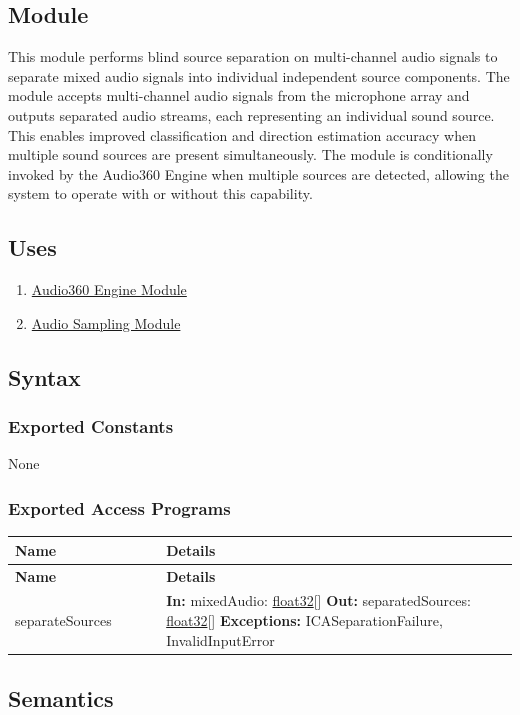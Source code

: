\documentclass[12pt, titlepage]{article}
\newenvironment{apitable}{%
\begin{center}
\begin{longtable}{|p{0.3\linewidth}|p{0.7\linewidth}|} 
\hline
\textbf{Name} & \textbf{Details} \\
\hline
\endfirsthead
\hline
\textbf{Name} & \textbf{Details} \\
\hline
\endhead
\hline
\endfoot
\hline
\endlastfoot
}{%
\end{longtable}
\end{center}
}
\newcommand{\apifunc}[4]{%
#1 & 
\textbf{In:} #2 \newline
\textbf{Out:} #3 \newline
\textbf{Exceptions:} #4 \\
\hline
}
\begin{document}
\subsection{Module}

This module performs blind source separation on multi-channel audio signals to
separate mixed audio signals into individual independent source components. The
module accepts multi-channel audio signals from the microphone array and outputs
separated audio streams, each representing an individual sound source. This
enables improved classification and direction estimation accuracy when multiple
sound sources are present simultaneously. The module is conditionally invoked by
the Audio360 Engine when multiple sources are detected, allowing the system to
operate with or without this capability.

\subsection{Uses}

\begin{enumerate}
  \item \hyperref[mod:Audio360Engine]{Audio360 Engine Module}
  \item \hyperref[mod:AudioSampling]{Audio Sampling Module}
\end{enumerate}

\subsection{Syntax}

\subsubsection{Exported Constants}

None

\subsubsection{Exported Access Programs}
\begin{apitable}
  \apifunc{separateSources}
    {mixedAudio: \hyperref[generic:float32]{float32}[]}
    {separatedSources: \hyperref[generic:float32]{float32}[]}
    {ICASeparationFailure, InvalidInputError}
\end{apitable}

\subsection{Semantics}
\end{document}
